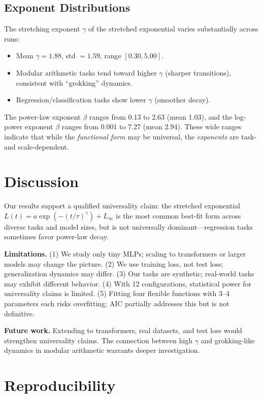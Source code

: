 \documentclass[11pt,a4paper]{article}
\begin{document}
\subsection{Exponent Distributions}

The stretching exponent $\gamma$ of the stretched exponential varies substantially across runs:
\begin{itemize}
    \item Mean $\gamma = 1.88$, std $= 1.59$, range $[0.30, 5.00]$.
    \item Modular arithmetic tasks tend toward higher $\gamma$ (sharper transitions), consistent with ``grokking'' dynamics.
    \item Regression/classification tasks show lower $\gamma$ (smoother decay).
\end{itemize}

The power-law exponent $\beta$ ranges from 0.13 to 2.63 (mean 1.03), and the log-power exponent $\beta$ ranges from 0.001 to 7.27 (mean 2.94). These wide ranges indicate that while the \emph{functional form} may be universal, the \emph{exponents} are task- and scale-dependent.

\section{Discussion}

Our results support a qualified universality claim: the stretched exponential $L(t) = a \exp(-(t/\tau)^\gamma) + L_\infty$ is the most common best-fit form across diverse tasks and model sizes, but is not universally dominant---regression tasks sometimes favor power-law decay.

\textbf{Limitations.}
(1) We study only tiny MLPs; scaling to transformers or larger models may change the picture.
(2) We use training loss, not test loss; generalization dynamics may differ.
(3) Our tasks are synthetic; real-world tasks may exhibit different behavior.
(4) With 12 configurations, statistical power for universality claims is limited.
(5) Fitting four flexible functions with 3--4 parameters each risks overfitting; AIC partially addresses this but is not definitive.

\textbf{Future work.}
Extending to transformers, real datasets, and test loss would strengthen universality claims.
The connection between high $\gamma$ and grokking-like dynamics in modular arithmetic warrants deeper investigation.

\section{Reproducibility}
\end{document}
